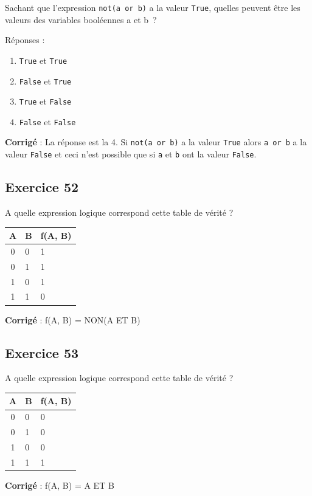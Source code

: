 \documentclass[11pt]{article}
\providecommand{\tightlist}{%
      \setlength{\itemsep}{0pt}\setlength{\parskip}{0pt}}
\begin{document}
Sachant que l'expression \texttt{not(a\ or\ b)} a la valeur
\texttt{True}, quelles peuvent être les valeurs des variables booléennes
a et b~?

Réponses :

\begin{enumerate}
\def\labelenumi{\arabic{enumi}.}
\tightlist
\item
  \texttt{True} et \texttt{True}
\item
  \texttt{False} et \texttt{True}
\item
  \texttt{True} et \texttt{False}
\item
  \texttt{False} et \texttt{False}
\end{enumerate}

    \textbf{Corrigé} : La réponse est la 4. Si \texttt{not(a\ or\ b)} a la
valeur \texttt{True} alors \texttt{a\ or\ b} a la valeur \texttt{False}
et ceci n'est possible que si \texttt{a} et \texttt{b} ont la valeur
\texttt{False}.

    \hypertarget{exercice-52}{%
\subsection{Exercice 52}\label{exercice-52}}

A quelle expression logique correspond cette table de vérité ?

\begin{longtable}[]{@{}cll@{}}
\toprule
A & B & f(A, B)\tabularnewline
\midrule
\endhead
0 & 0 & 1\tabularnewline
0 & 1 & 1\tabularnewline
1 & 0 & 1\tabularnewline
1 & 1 & 0\tabularnewline
\bottomrule
\end{longtable}

    \textbf{Corrigé} : f(A, B) = NON(A ET B)

    \hypertarget{exercice-53}{%
\subsection{Exercice 53}\label{exercice-53}}

A quelle expression logique correspond cette table de vérité ?

\begin{longtable}[]{@{}cll@{}}
\toprule
A & B & f(A, B)\tabularnewline
\midrule
\endhead
0 & 0 & 0\tabularnewline
0 & 1 & 0\tabularnewline
1 & 0 & 0\tabularnewline
1 & 1 & 1\tabularnewline
\bottomrule
\end{longtable}

    \textbf{Corrigé} : f(A, B) = A ET B
\end{document}

